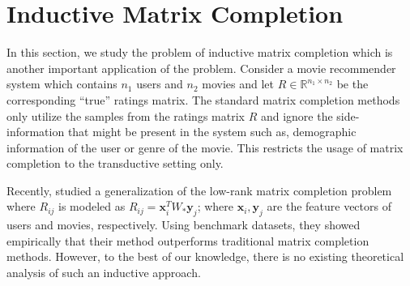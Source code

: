 \documentclass[11pt]{article}
\newcommand{\R}{\mathbb{R}}
\newcommand{\Wo}{W_*}
\newcommand{\x}{\bm{x}}
\newcommand{\y}{\bm{y}}
\begin{document}

\section{Inductive Matrix Completion}\label{sec:imc}
In this section, we study the problem of inductive matrix completion which is another important application of the \lrrom problem. Consider a movie recommender system which contains $n_1$ users and $n_2$ movies and let $R\in \mathbb{R}^{n_1\times n_2}$ be the corresponding ``true'' ratings matrix. 
The standard matrix completion methods  only utilize the samples from the ratings matrix $R$ and ignore the side-information that might be present in the system such as, demographic information of the user or genre of the movie. This  restricts the usage of matrix completion to the transductive setting only. %

Recently, \cite{AbernethyBEV09} studied a generalization of the low-rank matrix completion problem where $R_{ij}$ is modeled as $R_{ij}=\x_i^T \Wo \y_j$; where $\x_i, \y_j$ are the feature vectors of users and movies, respectively. Using benchmark datasets, they showed empirically that their method  outperforms  traditional matrix completion methods. However, to the best of our knowledge, there is no existing theoretical analysis of such an inductive approach. 
\end{document}
